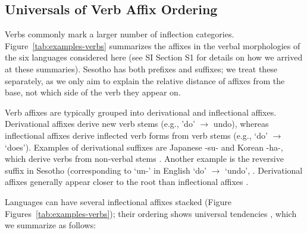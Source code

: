 \documentclass[man]{apa7}
\newcommand{\citep}{\parencite}
\newcommand\mhahn[1]{{\color{red}(#1)}}
\begin{document}


\subsection{Universals of Verb Affix Ordering}\label{sec:univ-verbs}
Verbs commonly mark a larger number of inflection categories.
Figure~\ref{tab:examples-verbs} summarizes the affixes in the verbal morphologies of the six languages considered here (see SI Section S1 for details on how we arrived at these summaries).
Sesotho has both prefixes and suffixes; we treat these separately, as we only aim to explain the relative distance of affixes from the base, not which side of the verb they appear on.

Verb affixes are typically grouped into derivational and inflectional affixes.
Derivational affixes derive new verb stems (e.g., 'do' $\rightarrow$ undo), whereas inflectional affixes derive inflected verb forms from verb stems (e.g., `do' $\rightarrow$ `does').
Examples of derivational suffixes are Japanese -su- and Korean -ha-, which derive verbs from non-verbal stems \citep{hasegawa2014japanese, yeon2010korean}.
Another example is the reversive suffix in Sesotho (corresponding to `un-' in English `do' $\rightarrow$ `undo', \citep{doke1967textbook}.
Derivational affixes generally appear closer to the root than inflectional affixes \citep{greenberg1963universals}.

Languages can have several inflectional affixes stacked (Figure Figures~\ref{tab:examples-verbs}); their ordering shows universal tendencies \citep{bybee-morphology-1985}, which we summarize as follows:
\end{document}
